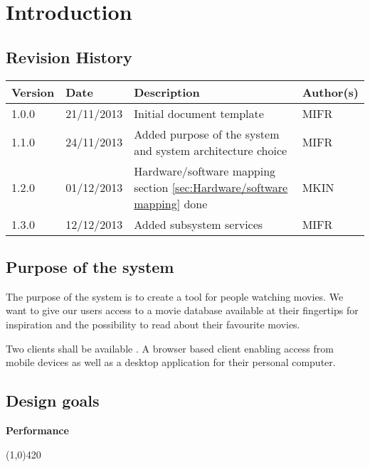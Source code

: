 \chapter{Introduction}
\label{sec:introduction}

\section{Revision History}
\begin{center}
    \begin{tabular}{ | l | l | p{6cm} | p{4cm} |}
    \hline
    Version & Date & Description & Author(s) 
    \\ \hline
    1.0.0 & 21/11/2013 & Initial document template & MIFR
    \\ \hline
    1.1.0 & 24/11/2013 & Added purpose of the system and system architecture choice & MIFR
    \\ \hline
    1.2.0 & 01/12/2013 & Hardware/software mapping section \ref{sec:Hardware/software mapping} done & MKIN
    \\ \hline
    1.3.0 & 12/12/2013 & Added subsystem services & MIFR
    \\ \hline
    \end{tabular}
\end{center}

\section{Purpose of the system}
The purpose of the system is to create a tool for people watching movies. We want to give our users access to a movie database available at their fingertips for inspiration and the possibility to read about their favourite movies.

Two clients shall be available . A browser based client enabling access from mobile devices as well as a desktop application for their personal computer.  




\section{Design goals}

\textbf{Performance}
\vspace{-1.1cm}
\begin{center}
\line(1,0){420}
\end{center}


